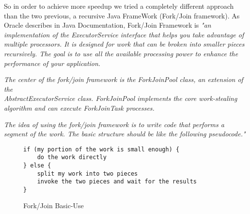 \documentclass{dithesis}
\begin{document}
        So in order to achieve more speedup we tried a completely different approach than the two previous, a recursive Java FrameWork (Fork/Join framework). As Oracle describes in Java Documentation, Fork/Join Framework \cite{Oracle Java Fork/Join Framework} is
    	\textit{"an implementation of the ExecutorService interface that helps you take advantage of multiple processors. It is designed for work that can be broken into smaller pieces recursively. The goal is to use all the available processing power to enhance the performance of your application.}

		\textit{The center of the fork/join framework is the ForkJoinPool class, an extension of the \\ AbstractExecutorService class. ForkJoinPool implements the core work-stealing algorithm and can execute ForkJoinTask processes.}

    \textit{The idea of using the fork/join framework is to write code that performs a segment of the work. The basic structure should be like the following pseudocode."}

        \begin{figure}[H]
\begin{lstlisting}
if (my portion of the work is small enough) {
    do the work directly
} else {
    split my work into two pieces
    invoke the two pieces and wait for the results
}
\end{lstlisting}
        \caption{Fork/Join Basic-Use}
        \end{figure}
\end{document}
